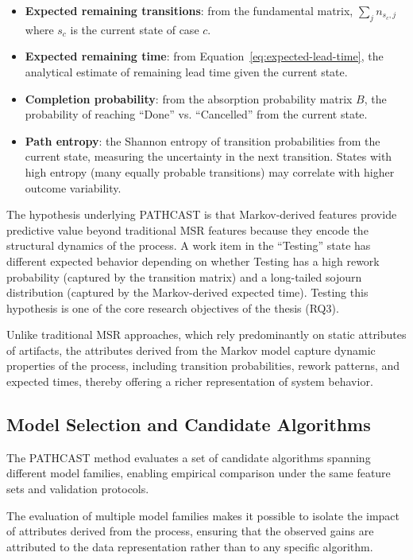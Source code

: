 \begin{itemize}
    \item \textbf{Expected remaining transitions}: from the fundamental
    matrix, $\sum_j n_{s_c, j}$ where $s_c$ is the current state of
    case $c$.
    \item \textbf{Expected remaining time}: from
    Equation~\ref{eq:expected-lead-time}, the analytical estimate of
    remaining lead time given the current state.
    \item \textbf{Completion probability}: from the absorption
    probability matrix $B$, the probability of reaching ``Done'' vs.
    ``Cancelled'' from the current state.
    \item \textbf{Path entropy}: the Shannon entropy of transition
    probabilities from the current state, measuring the uncertainty in the
    next transition. States with high entropy (many equally probable
    transitions) may correlate with higher outcome variability.
\end{itemize}

The hypothesis underlying PATHCAST is that Markov-derived features
provide predictive value beyond traditional MSR features because they
encode the structural dynamics of the process. A work item in the ``Testing''
state has different expected behavior depending on whether Testing has a
high rework probability (captured by the transition matrix) and a
long-tailed sojourn distribution (captured by the Markov-derived expected
time). Testing this hypothesis is one of the core research objectives of
the thesis (RQ3).

Unlike traditional MSR approaches, which rely predominantly on static attributes of artifacts, the attributes derived from the Markov model capture dynamic properties of the process, including transition probabilities, rework patterns, and expected times, thereby offering a richer representation of system behavior.


\subsection{Model Selection and Candidate Algorithms}
\label{sec:ml-models}

The PATHCAST method evaluates a set of candidate algorithms
spanning different model families, enabling empirical comparison under
the same feature sets and validation protocols.

The evaluation of multiple model families makes it possible to isolate the impact of attributes derived from the process, ensuring that the observed gains are attributed to the data representation rather than to any specific algorithm.


